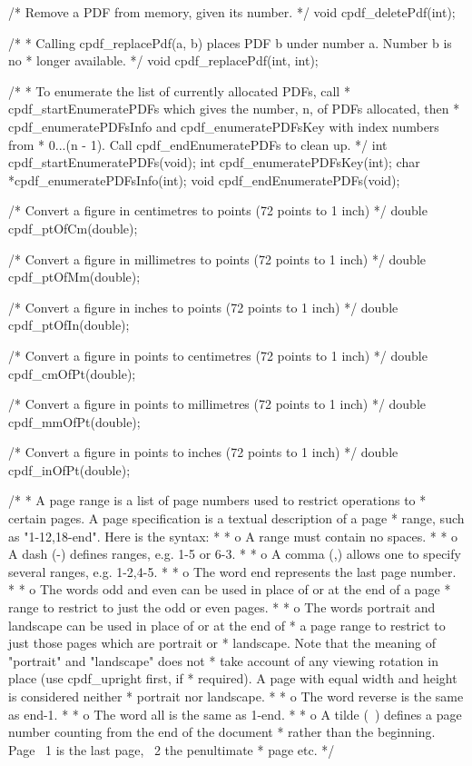 /* Remove a PDF from memory, given its number. */
void cpdf_deletePdf(int);

/*
 * Calling cpdf_replacePdf(a, b) places PDF b under number a. Number b is no
 * longer available.
 */
void cpdf_replacePdf(int, int);

/*
 * To enumerate the list of currently allocated PDFs, call
 * cpdf_startEnumeratePDFs which gives the number, n, of PDFs allocated, then
 * cpdf_enumeratePDFsInfo and cpdf_enumeratePDFsKey with index numbers from
 * 0...(n - 1). Call cpdf_endEnumeratePDFs to clean up.
 */
int cpdf_startEnumeratePDFs(void);
int cpdf_enumeratePDFsKey(int);
char *cpdf_enumeratePDFsInfo(int);
void cpdf_endEnumeratePDFs(void);

/* Convert a figure in centimetres to points (72 points to 1 inch) */
double cpdf_ptOfCm(double);

/* Convert a figure in millimetres to points (72 points to 1 inch) */
double cpdf_ptOfMm(double);

/* Convert a figure in inches to points (72 points to 1 inch) */
double cpdf_ptOfIn(double);

/* Convert a figure in points to centimetres (72 points to 1 inch) */
double cpdf_cmOfPt(double);

/* Convert a figure in points to millimetres (72 points to 1 inch) */
double cpdf_mmOfPt(double);

/* Convert a figure in points to inches (72 points to 1 inch) */
double cpdf_inOfPt(double);

/*
 * A page range is a list of page numbers used to restrict operations to
 * certain pages. A page specification is a textual description of a page
 * range, such as "1-12,18-end". Here is the syntax:
 *
 * o A range must contain no spaces.
 *
 * o A dash (-) defines ranges, e.g. 1-5 or 6-3.
 *
 * o A comma (,) allows one to specify several ranges, e.g. 1-2,4-5.
 *
 * o The word end represents the last page number.
 *
 * o The words odd and even can be used in place of or at the end of a page
 * range to restrict to just the odd or even pages.
 *
 * o The words portrait and landscape can be used in place of or at the end of
 * a page range to restrict to just those pages which are portrait or
 * landscape. Note that the meaning of "portrait" and "landscape" does not
 * take account of any viewing rotation in place (use cpdf_upright first, if
 * required). A page with equal width and height is considered neither
 * portrait nor landscape.
 *
 * o The word reverse is the same as end-1.
 *
 * o The word all is the same as 1-end.
 *
 * o A tilde (~) defines a page number counting from the end of the document
 * rather than the beginning. Page ~1 is the last page, ~2 the penultimate
 * page etc.
 */

